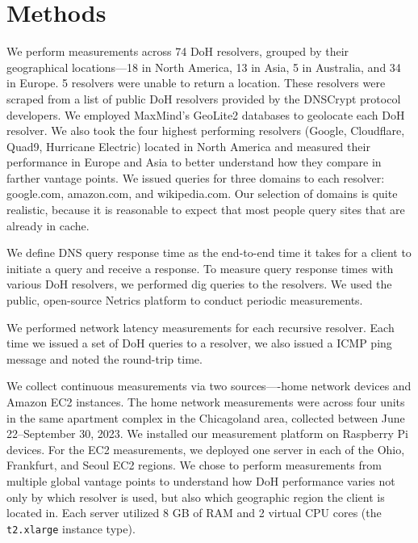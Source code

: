 \section{Methods}\label{sec:method}

We perform measurements across 74 DoH resolvers, grouped by their geographical locations—18 in North America, 13 in Asia, 5 in Australia, and 34 in Europe. 5 resolvers were unable to return a location. These resolvers were scraped from a list of public DoH resolvers provided by the DNSCrypt protocol developers. We employed MaxMind’s GeoLite2 databases to geolocate each DoH resolver. We also took the four highest performing resolvers (Google, Cloudflare, Quad9, Hurricane Electric) located in North America and measured their performance in Europe and Asia to better understand how they compare in farther vantage points. We issued queries for three domains to each resolver: google.com, amazon.com, and wikipedia.com. Our selection of domains is quite realistic, because it is reasonable to expect that most people query sites that are already in cache. 

We define DNS query response time as the
end-to-end time it takes for a client to initiate a query and receive a
response.  To measure query response times with various DoH resolvers, we
performed dig queries to the resolvers. We used the public, open-source Netrics
platform to conduct periodic measurements.

We performed network latency measurements for each recursive resolver.  Each time
we issued a set of DoH queries to a resolver, we also issued a ICMP ping
message and noted the round-trip time.

We collect continuous measurements via two sources—-home network devices and Amazon EC2 instances. The home network measurements were across four units in the same apartment complex in the Chicagoland area, collected between June 22--September 30, 2023. 
We installed our measurement platform on Raspberry Pi devices.
For the EC2 measurements, we deployed one server
in each of the Ohio, Frankfurt, and Seoul EC2 regions.  We chose to perform
measurements from multiple global vantage points to understand how DoH
performance varies not only by which resolver is used, but also which
geographic region the client is located in.  Each server utilized 8 GB of RAM
and 2 virtual CPU cores (the \texttt{t2.xlarge} instance type).
